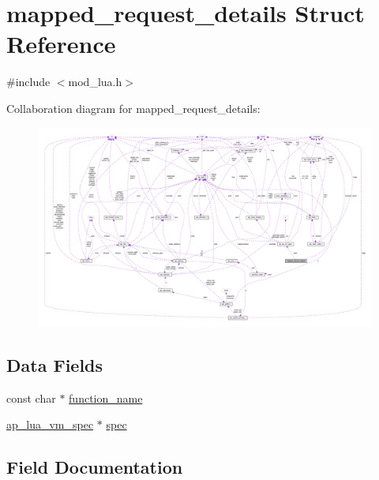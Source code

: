 \hypertarget{structmapped__request__details}{}\section{mapped\+\_\+request\+\_\+details Struct Reference}
\label{structmapped__request__details}


{\ttfamily \#include $<$mod\+\_\+lua.\+h$>$}



Collaboration diagram for mapped\+\_\+request\+\_\+details\+:
\nopagebreak
\begin{figure}[H]
\begin{center}
\leavevmode
\includegraphics[width=350pt]{structmapped__request__details__coll__graph}
\end{center}
\end{figure}
\subsection*{Data Fields}
\begin{DoxyCompactItemize}
\item 
const char $\ast$ \hyperlink{structmapped__request__details_af71415be5e31a868c49e36b93b2f251d}{function\+\_\+name}
\item 
\hyperlink{structap__lua__vm__spec}{ap\+\_\+lua\+\_\+vm\+\_\+spec} $\ast$ \hyperlink{structmapped__request__details_a96ff713c7b7d94e5d0da7db0e2eacfc4}{spec}
\end{DoxyCompactItemize}


\subsection{Field Documentation}
